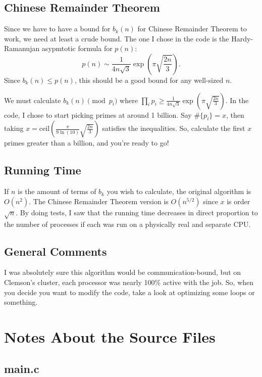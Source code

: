 \documentclass[11pt]{article}
\begin{document}
\subsection{Chinese Remainder Theorem}

Since we have to have a bound for $b_k(n)$ for Chinese Remainder Theorem to work,
we need at least a crude bound. The one I chose in the code is the Hardy-Ramanujan asypmtotic
formula for $p(n)$:
\begin{equation}
p(n) \sim \frac{1}{4n\sqrt{3}}\exp\left(\pi \sqrt{\frac{2n}{3}}\right).
\end{equation}
Since $b_k(n) \leq p(n)$, this should be a good bound for any well-sized $n$.

We must calculate $b_k(n) \pmod{p_i}$ where $\prod_{i}{p_i} \geq \frac{1}{4n\sqrt{3}}\exp\left(\pi \sqrt{\frac{2n}{3}}\right)$.
In the code, I chose to start picking primes at around 1 billion. Say $\#\{p_i\} = x$, then taking $x = \mbox{ceil}\left(\frac{\pi}{9\ln(10)} \sqrt{\frac{2n}{3}}\right)$
satisfies the inequalities. So, calculate the first $x$ primes greater than a billion, and you're ready to go!

\subsection{Running Time}

If $n$ is the amount of terms of $b_k$ you wish to calculate, the original algorithm is $O(n^2)$.
The Chinese Remainder Theorem version is $O\left(n^{5/2}\right)$ since $x$ is order $\sqrt{n}$.
By doing tests, I saw that the running time decreases in direct proportion to the number
of processes if each was run on a physically real and separate CPU.

\subsection{General Comments}

I was absolutely sure this algorithm would be communication-bound, but on Clemson's cluster,
each processor was nearly 100\% active with the job. So, when you decide you want to modify the code,
take a look at optimizing some loops or something.

\section{Notes About the Source Files}

\subsection{main.c}
\end{document}
